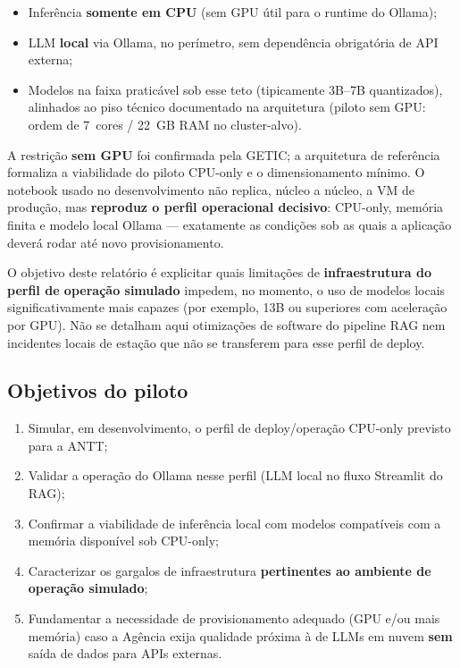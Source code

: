 \documentclass[12pt, a4paper]{article}
\begin{document}
\begin{itemize}
  \item Inferência \textbf{somente em CPU} (sem GPU útil para o runtime do Ollama);
  \item LLM \textbf{local} via Ollama, no perímetro, sem dependência obrigatória de API externa;
  \item Modelos na faixa praticável sob esse teto (tipicamente 3B--7B quantizados), alinhados ao piso técnico documentado na arquitetura (piloto sem GPU: ordem de 7~cores / 22~GB RAM no cluster-alvo).
\end{itemize}

A restrição \textbf{sem GPU} foi confirmada pela GETIC; a arquitetura de referência formaliza a viabilidade do piloto CPU-only e o dimensionamento mínimo. O notebook usado no desenvolvimento não replica, núcleo a núcleo, a VM de produção, mas \textbf{reproduz o perfil operacional decisivo}: CPU-only, memória finita e modelo local Ollama --- exatamente as condições sob as quais a aplicação deverá rodar até novo provisionamento.

O objetivo deste relatório é explicitar quais limitações de \textbf{infraestrutura do perfil de operação simulado} impedem, no momento, o uso de modelos locais significativamente mais capazes (por exemplo, 13B ou superiores com aceleração por GPU). Não se detalham aqui otimizações de software do pipeline RAG nem incidentes locais de estação que não se transferem para esse perfil de deploy.

\subsection{Objetivos do piloto}

\begin{enumerate}[label=\textbf{\arabic*.}]
  \item Simular, em desenvolvimento, o perfil de deploy/operação CPU-only previsto para a ANTT;
  \item Validar a operação do Ollama nesse perfil (LLM local no fluxo Streamlit do RAG);
  \item Confirmar a viabilidade de inferência local com modelos compatíveis com a memória disponível sob CPU-only;
  \item Caracterizar os gargalos de infraestrutura \textbf{pertinentes ao ambiente de operação simulado};
  \item Fundamentar a necessidade de provisionamento adequado (GPU e/ou mais memória) caso a Agência exija qualidade próxima à de LLMs em nuvem \textbf{sem} saída de dados para APIs externas.
\end{enumerate}
\end{document}
